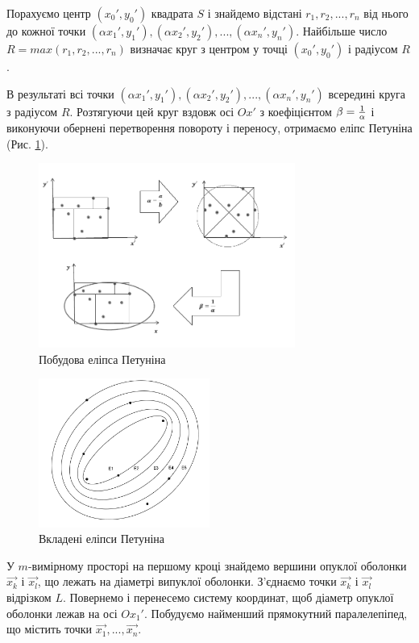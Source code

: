 \documentclass[14pt,a4paper,titlepage]{extarticle}
\begin{document}
Порахуємо центр $(x_0',y_0')$ квадрата $S$ і знайдемо відстані
$r_1,r_2,...,r_n$ від нього до кожної точки $(\alpha x_1',y_1'), (\alpha
x_2',y_2'),...,(\alpha x_n',y_n')$. Найбільше число $R=max(r_1,r_2,...,r_n)$
визначає круг з центром у точці $(x_0',y_0')$ і радіусом $R$.\par
В результаті всі
точки $(\alpha x_1',y_1'), (\alpha x_2',y_2'),...,(\alpha x_n',y_n')$ всередині
круга з радіусом $R$. Розтягуючи цей круг вздовж осі $Ox'$ з коефіцієнтом
$\beta={1\over \alpha}$ і виконуючи обернені перетворення повороту і переносу,
отримаємо еліпс Петуніна (Рис. \ref{fig:pet2}).\par

\begin{figure}[h!]
\centering
\includegraphics[width=0.75\textwidth]{pet2}
\caption{Побудова еліпса Петуніна}
\label{fig:pet2}
\end{figure}

\begin{figure}[h!]
\centering
\includegraphics[width=0.5\textwidth]{pet3}
\caption{Вкладені еліпси Петуніна}
\label{fig:pet3}
\end{figure}

У $m$-вимірному просторі на першому кроці знайдемо вершини опуклої оболонки
$\overrightarrow{x_k}$ і $\overrightarrow{x_l}$, що лежать на діаметрі випуклої
оболонки. З’єднаємо точки $\overrightarrow{x_k}$ і $\overrightarrow{x_l}$
відрізком $L$. Повернемо і перенесемо систему координат, щоб діаметр опуклої
оболонки лежав на осі $Ox_1'$. Побудуємо найменший прямокутний паралелепіпед,
що містить точки $\overrightarrow{x_1},...,\overrightarrow{x_n}$.
\par
\end{document}
